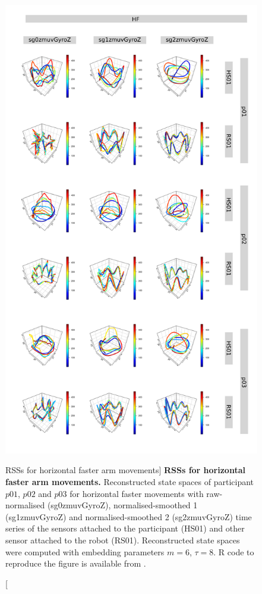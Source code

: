 \begin{figure}
\centering
\includegraphics[height=0.85\textheight]{rss_HF}
\caption
	[RSSs for horizontal faster arm movements]{
	{\bf RSSs for horizontal faster arm movements.}
	Reconstructed state spaces %
	of participant $p01$, $p02$ and $p03$ for horizontal faster movements 
	with raw-normalised (sg0zmuvGyroZ), 
	normalised-smoothed 1 (sg1zmuvGyroZ) and 
	normalised-smoothed 2 (sg2zmuvGyroZ) time series of the 
	sensors attached to the participant (HS01) and other sensor 
	attached to the robot (RS01).	
	Reconstructed state spaces were computed with 
	embedding parameters $m=6$, $\tau=8$.
	R code to reproduce the figure is available from \cite{xochicale2018}.
        }
    \label{fig:rss_HF}
\end{figure}



